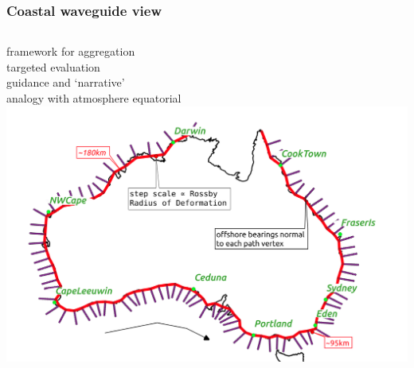\begin{frame}
\frametitle{Coastal waveguide view}
\begin{columns}
    \begin{column}{0.5\textwidth}
      \centering
      framework for aggregation\\
      targeted evaluation \\
      guidance and `narrative'\\
      analogy with atmosphere equatorial\\
      \includegraphics[width=\textwidth]{figures/maps/map_overview.png}
    \end{column}


\end{columns}
\end{frame}
